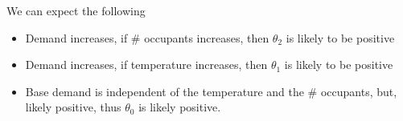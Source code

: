 \documentclass{beamer}
\begin{document}
\begin{frame}{We can expect the following}
    \begin{itemize}
        \item<+-> Demand increases, if \# occupants increases, then $\theta_{2}$ is likely to be positive
        
        \item<+-> Demand increases, if temperature increases, then $\theta_{1}$ is likely to be positive
        
        \item<+-> Base demand is independent of the temperature and the \# occupants, but, likely positive, thus $\theta_0$ is likely positive.
        
    \end{itemize}
\end{frame}
\end{document}
